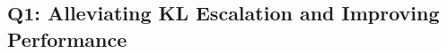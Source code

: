 \documentclass{article} %
\begin{document}


\subsection{$\mathbf{Q1}$: Alleviating KL Escalation and Improving Performance}
\label{subsec: performance}
\end{document}
